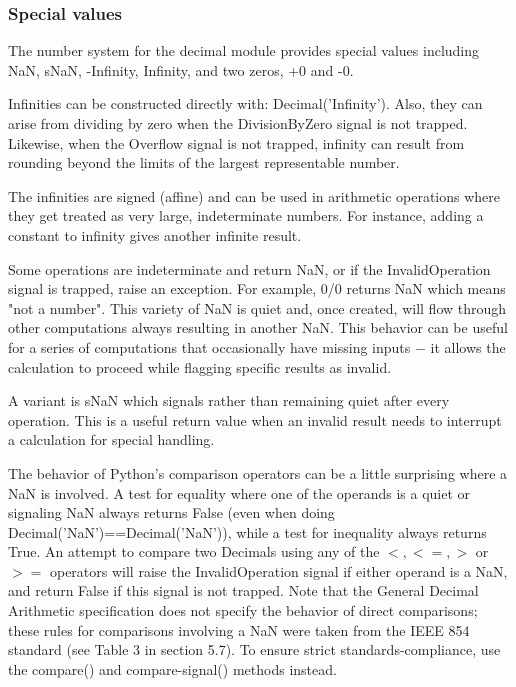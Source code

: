 \subsubsection{Special values}

The number system for the decimal module provides special values including NaN, sNaN, -Infinity, Infinity, and two zeros, +0 and -0.

\vpara
Infinities can be constructed directly with: Decimal('Infinity'). Also, they can arise from dividing by zero when the DivisionByZero signal is not trapped. Likewise, when the Overflow signal is not trapped, infinity can result from rounding beyond the limits of the largest representable number.

\vpara
The infinities are signed (affine) and can be used in arithmetic operations where they get treated as very large, indeterminate numbers. For instance, adding a constant to infinity gives another infinite result.

\vpara
Some operations are indeterminate and return NaN, or if the InvalidOperation signal is trapped, raise an exception. For example, 0/0 returns NaN which means "not a number". This variety of NaN is quiet and, once created, will flow through other computations always resulting in another NaN. This behavior can be useful for a series of computations that occasionally have missing inputs $-$ it allows the calculation to proceed while flagging specific results as invalid.

\vpara
A variant is sNaN which signals rather than remaining quiet after every operation. This is a useful return value when an invalid result needs to interrupt a calculation for special handling.

\vpara
The behavior of Python's comparison operators can be a little surprising where a NaN is involved. A test for equality where one of the operands is a quiet or signaling NaN always returns False (even when doing Decimal('NaN')==Decimal('NaN')), while a test for inequality always returns True. An attempt to compare two Decimals using any of the $<, <=, >$ or $>=$ operators will raise the InvalidOperation signal if either operand is a NaN, and return False if this signal is not trapped. Note that the General Decimal Arithmetic specification does not specify the behavior of direct comparisons; these rules for comparisons involving a NaN were taken from the IEEE 854 standard (see Table 3 in section 5.7). To ensure strict standards-compliance, use the compare() and compare-signal() methods instead.

